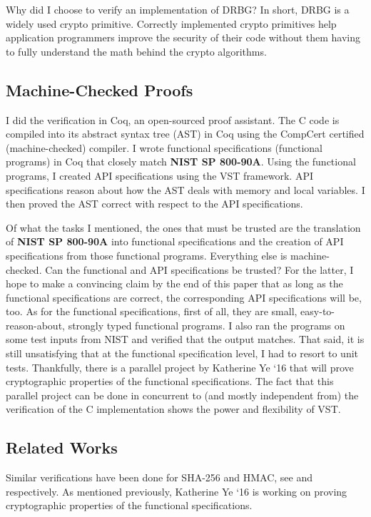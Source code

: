 \documentclass[pageno]{jpaper}
\newcommand{\stdtitle}[1]{\textbf{#1}}
\begin{document}
Why did I choose to verify an implementation of DRBG? In short, DRBG is a widely used crypto primitive. Correctly implemented crypto primitives help application programmers improve the security of their code without them having to fully understand the math behind the crypto algorithms.

\subsection{Machine-Checked Proofs}
I did the verification in Coq, an open-sourced proof assistant. The C code is compiled into its abstract syntax tree (AST) in Coq using the CompCert certified (machine-checked) compiler. I wrote functional specifications (functional programs) in Coq that closely match \stdtitle{NIST SP 800-90A}. Using the functional programs, I created API specifications using the VST framework. API specifications reason about how the AST deals with memory and local variables. I then proved the AST correct with respect to the API specifications.

Of what the tasks I mentioned, the ones that must be trusted are the translation of \stdtitle{NIST SP 800-90A} into functional specifications and the creation of API specifications from those functional programs. Everything else is machine-checked. Can the functional and API specifications be trusted? For the latter, I hope to make a convincing claim by the end of this paper that as long as the functional specifications are correct, the corresponding API specifications will be, too. As for the functional specifications, first of all, they are small, easy-to-reason-about, strongly typed functional programs. I also ran the programs on some test inputs from NIST and verified that the output matches. That said, it is still unsatisfying that at the functional specification level, I had to resort to unit tests. Thankfully, there is a parallel project by Katherine Ye ‘16 that will prove cryptographic properties of the functional specifications. The fact that this parallel project can be done in concurrent to (and mostly independent from) the verification of the C implementation shows the power and flexibility of VST.

\subsection{Related Works}
Similar verifications have been done for SHA-256 and HMAC, see \cite{sha} and \cite{hmac} respectively. As mentioned previously, Katherine Ye ‘16 is working on proving cryptographic properties of the functional specifications.
\end{document}
